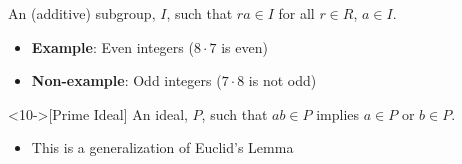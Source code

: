 \begin{frame}[t]
\begin{overprint}
		\begin{definition}[Ideal]
			An (additive) subgroup, $I$, such that $ra \in I$ for all $r \in R$, $a \in I$.
		\end{definition}

		\begin{itemize}
			\item<8-> \textbf{Example}: Even integers ($8 \cdot 7$ is even)
			\item<9-> \textbf{Non-example}: Odd integers ($7 \cdot 8$ is not odd)
		\end{itemize}

		\medskip

		\begin{definition}<10->[Prime Ideal]
			An ideal, $P$, such that $ab \in P$ implies $a \in P$ or $b \in P$.
		\end{definition}

		\begin{itemize}
			\item<11-> This is a generalization of Euclid's Lemma
		\end{itemize}


	\end{overprint}
\end{frame}

